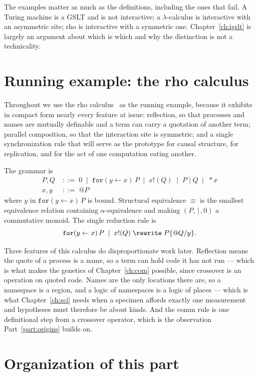 The examples matter as much as the definitions, including the ones that
fail.
A Turing machine is a GSLT and is not interactive; a $\lambda$-calculus is
interactive with an asymmetric site; rho is interactive with a symmetric
one.
Chapter~\ref{ch:igslt} is largely an argument about which is which and
why the distinction is not a technicality.

\section{Running example: the rho calculus}
\label{sec:rho-running}

Throughout we use the rho calculus~\cite{meredith2005rho} as the running
example, because it exhibits in compact form nearly every feature at
issue: reflection, so that processes and names are mutually definable and
a term can carry a quotation of another term; parallel composition, so
that the interaction site is symmetric; and a single synchronization rule
that will serve as the prototype for causal structure, for replication,
and for the act of one computation eating another.

The grammar is
\begin{align}
  P, Q &\;::=\; 0 \;\mid\; \mathtt{for}(y \leftarrow x)\,P \;\mid\;
               x!(Q) \;\mid\; P \mid Q \;\mid\; {*}x \\
  x, y &\;::=\; @P
\end{align}
where $y$ in $\mathtt{for}(y \leftarrow x)\,P$ is bound.
Structural equivalence $\equiv$ is the smallest equivalence relation
containing $\alpha$-equivalence and making $(P,\,|\,,0)$ a commutative
monoid.
The single reduction rule is
\[
  \mathtt{for}(y \leftarrow x)\,P \;\mid\; x!(Q)
  \;\rewrite\;
  P\{@Q / y\}.
\]

Three features of this calculus do disproportionate work later.
Reflection means the quote of a process is a name, so a term can hold
code it has not run --- which is what makes the genetics of
Chapter~\ref{ch:com} possible, since crossover is an operation on quoted
code.
Names are the only locations there are, so a namespace is a region, and
a logic of namespaces is a logic of places --- which is what
Chapter~\ref{ch:sci} needs when a specimen affords exactly one
measurement and hypotheses must therefore be about kinds.
And the comm rule is one definitional step from a crossover operator,
which is the observation Part~\ref{part:origins} builds on.

\section{Organization of this part}

